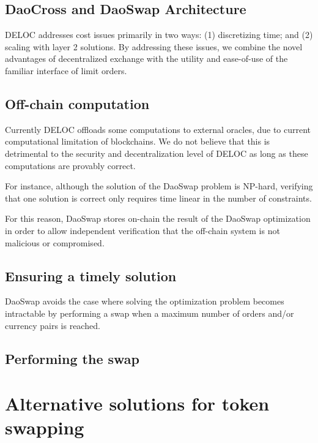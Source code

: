 \documentclass[11pt, reqno]{amsart}
\theoremstyle{definition}
\theoremstyle{remark}
\begin{document}
\subsection{DaoCross and DaoSwap Architecture}
DELOC addresses cost issues primarily in two ways: (1) discretizing time; and
(2) scaling with layer 2 solutions. By addressing these issues, we combine the
novel advantages of decentralized exchange with the utility and ease-of-use of
the familiar interface of limit orders.

\subsection{Off-chain computation}
Currently DELOC offloads some computations to external oracles, due to current
computational limitation of blockchains. We do not believe that this is detrimental
to the security and decentralization level of DELOC as long as these computations
are provably correct.

For instance, although the solution of the DaoSwap problem is NP-hard, verifying
that one solution is correct only requires time linear in the number of
constraints.

For this reason, DaoSwap stores on-chain the result of the DaoSwap optimization
in order to allow independent verification that the off-chain system is not
malicious or compromised.

\subsection{Ensuring a timely solution}
DaoSwap avoids the case where solving the optimization problem becomes
intractable by performing a swap when a maximum number of orders and/or
currency pairs is reached.

\subsection{Performing the swap}


\section{Alternative solutions for token swapping}
\label{AlSoToSw}
\end{document}
